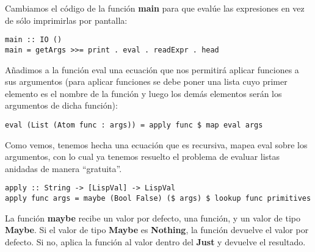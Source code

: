 Cambiamos el c\'odigo de la funci\'on \textbf{main} para que eval\'ue las expresiones en vez de s\'olo imprimirlas por pantalla:\\

\begin{minipage}{\linewidth}
\begin{small}
\begin{lstlisting}[frame=single]
main :: IO ()
main = getArgs >>= print . eval . readExpr . head
\end{lstlisting}
\end{small}
\end{minipage}

A\~nadimos a la funci\'on eval una ecuaci\'on que nos permitir\'a aplicar funciones a sus argumentos (para aplicar funciones se debe poner una lista cuyo primer elemento es el nombre de la funci\'on y luego los dem\'as elementos ser\'an los argumentos de dicha funci\'on):\\

\begin{minipage}{\linewidth}
\begin{small}
\begin{lstlisting}[frame=single]
eval (List (Atom func : args)) = apply func $ map eval args
\end{lstlisting}
\end{small}
\end{minipage}

Como vemos, tenemos hecha una ecuaci\'on que es recursiva, mapea eval sobre los argumentos, con lo cual ya tenemos resuelto el problema de evaluar listas anidadas de manera ``gratuita''.\\

\begin{minipage}{\linewidth}
\begin{small}
\begin{lstlisting}[frame=single]
apply :: String -> [LispVal] -> LispVal
apply func args = maybe (Bool False) ($ args) $ lookup func primitives
\end{lstlisting}
\end{small}
\end{minipage}

La funci\'on \textbf{maybe} recibe un valor por defecto, una funci\'on, y un valor de tipo \textbf{Maybe}. Si el valor de tipo \textbf{Maybe} es \textbf{Nothing}, la funci\'on devuelve el valor por defecto. Si no, aplica la funci\'on al valor dentro del \textbf{Just} y devuelve el resultado.\\

